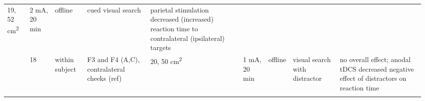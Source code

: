 \documentclass[11pt,english,]{memoir}
\begin{document}
\begin{longtable}[]{@{}lllllllll@{}}
\begin{minipage}[t]{0.04\columnwidth}
19,
52
cm\textsuperscript{2}\strut
\end{minipage} & \begin{minipage}[t]{0.06\columnwidth}\raggedright
2 mA, 20
min\strut
\end{minipage} & \begin{minipage}[t]{0.05\columnwidth}\raggedright
offline\strut
\end{minipage} & \begin{minipage}[t]{0.06\columnwidth}\raggedright
cued
visual
search\strut
\end{minipage} & \begin{minipage}[t]{0.25\columnwidth}\raggedright
parietal stimulation decreased (increased)
reaction time to contralateral (ipsilateral)
targets\strut
\end{minipage}\tabularnewline
\begin{minipage}[t]{0.08\columnwidth}\raggedright
\textcite{Cosman2015}\strut
\end{minipage} & \begin{minipage}[t]{0.03\columnwidth}\raggedright
18\strut
\end{minipage} & \begin{minipage}[t]{0.05\columnwidth}\raggedright
within
subject\strut
\end{minipage} & \begin{minipage}[t]{0.15\columnwidth}\raggedright
F3 and F4 (A,C), contralateral
cheeks (ref)\strut
\end{minipage} & \begin{minipage}[t]{0.04\columnwidth}\raggedright
20,
50
cm\textsuperscript{2}\strut
\end{minipage} & \begin{minipage}[t]{0.06\columnwidth}\raggedright
1 mA, 20
min\strut
\end{minipage} & \begin{minipage}[t]{0.05\columnwidth}\raggedright
offline\strut
\end{minipage} & \begin{minipage}[t]{0.06\columnwidth}\raggedright
visual
search
with
distractor\strut
\end{minipage} & \begin{minipage}[t]{0.25\columnwidth}\raggedright
no overall effect; anodal tDCS decreased negative
effect of distractors on reaction time\strut
\end{minipage}\tabularnewline
\begin{minipage}[t]{0.08\columnwidth}\raggedright
\textcite{Weiss2012}\strut

\end{minipage}
\end{longtable}
\end{document}
